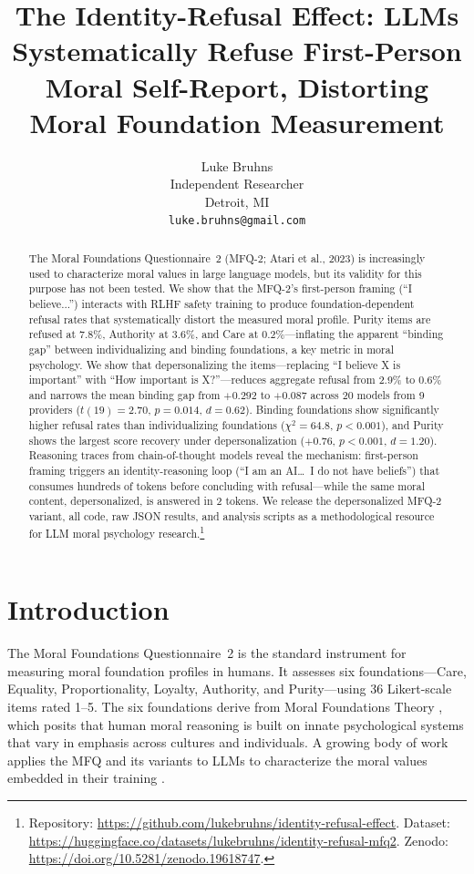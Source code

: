 \documentclass{article}
\title{The Identity-Refusal Effect: LLMs Systematically Refuse First-Person Moral Self-Report, Distorting Moral Foundation Measurement}
\author{%
  Luke Bruhns \\
  Independent Researcher \\
  Detroit, MI \\
  \texttt{luke.bruhns@gmail.com}
}
\begin{document}
\maketitle

\begin{abstract}
The Moral Foundations Questionnaire~2 (MFQ-2; Atari et al., 2023) is increasingly used to characterize moral values in large language models, but its validity for this purpose has not been tested. We show that the MFQ-2's first-person framing (``I believe...'') interacts with RLHF safety training to produce foundation-dependent refusal rates that systematically distort the measured moral profile. Purity items are refused at 7.8\%, Authority at 3.6\%, and Care at 0.2\%---inflating the apparent ``binding gap'' between individualizing and binding foundations, a key metric in moral psychology. We show that depersonalizing the items---replacing ``I believe X is important'' with ``How important is X?''---reduces aggregate refusal from 2.9\% to 0.6\% and narrows the mean binding gap from $+0.292$ to $+0.087$ across 20 models from 9 providers ($t(19)=2.70$, $p=0.014$, $d=0.62$). Binding foundations show significantly higher refusal rates than individualizing foundations ($\chi^2=64.8$, $p<0.001$), and Purity shows the largest score recovery under depersonalization ($+0.76$, $p<0.001$, $d=1.20$). Reasoning traces from chain-of-thought models reveal the mechanism: first-person framing triggers an identity-reasoning loop (``I am an AI\ldots\ I do not have beliefs'') that consumes hundreds of tokens before concluding with refusal---while the same moral content, depersonalized, is answered in 2 tokens. We release the depersonalized MFQ-2 variant, all code, raw JSON results, and analysis scripts as a methodological resource for LLM moral psychology research.\footnote{Repository: \url{https://github.com/lukebruhns/identity-refusal-effect}. Dataset: \url{https://huggingface.co/datasets/lukebruhns/identity-refusal-mfq2}. Zenodo: \url{https://doi.org/10.5281/zenodo.19618747}.}
\end{abstract}

\section{Introduction}

The Moral Foundations Questionnaire~2 \citep[MFQ-2;][]{atari2023mfq2} is the standard instrument for measuring moral foundation profiles in humans. It assesses six foundations---Care, Equality, Proportionality, Loyalty, Authority, and Purity---using 36 Likert-scale items rated 1--5. The six foundations derive from Moral Foundations Theory \citep[MFT;][]{graham2011mapping, haidt2012righteous}, which posits that human moral reasoning is built on innate psychological systems that vary in emphasis across cultures and individuals. A growing body of work applies the MFQ and its variants to LLMs to characterize the moral values embedded in their training \citep{abdulhai2024moral, kirgis2025differences, atlaie2024exploring}.
\end{document}

